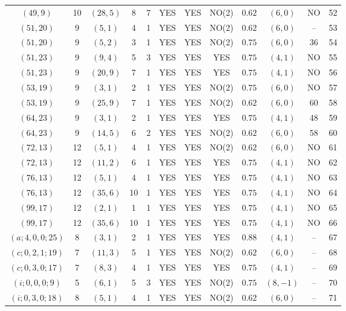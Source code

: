 \begin{longtable}{|c|c|c|c|c|c|c|c|c|c|c|c|}
$(49,9)$ & 10 & $(28,5)$ & 8 & 7 & YES & YES & NO(2) & $0.62$ & $(6,0)$ & NO & 52\\
$(51,20)$ & 9 & $(5,1)$ & 4 & 1 & YES & YES & NO(2) & $0.62$ & $(6,0)$ & -- & 53\\
$(51,20)$ & 9 & $(5,2)$ & 3 & 1 & YES & YES & NO(2) & $0.75$ & $(6,0)$ & 36 & 54\\
$(51,23)$ & 9 & $(9,4)$ & 5 & 3 & YES & YES & YES & $0.75$ & $(4,1)$ & NO & 55\\
$(51,23)$ & 9 & $(20,9)$ & 7 & 1 & YES & YES & YES & $0.75$ & $(4,1)$ & NO & 56\\
$(53,19)$ & 9 & $(3,1)$ & 2 & 1 & YES & YES & NO(2) & $0.75$ & $(6,0)$ & NO & 57\\
$(53,19)$ & 9 & $(25,9)$ & 7 & 1 & YES & YES & NO(2) & $0.62$ & $(6,0)$ & 60 & 58\\
$(64,23)$ & 9 & $(3,1)$ & 2 & 1 & YES & YES & YES & $0.75$ & $(4,1)$ & 48 & 59\\
$(64,23)$ & 9 & $(14,5)$ & 6 & 2 & YES & YES & NO(2) & $0.62$ & $(6,0)$ & 58 & 60\\
$(72,13)$ & 12 & $(5,1)$ & 4 & 1 & YES & YES & NO(2) & $0.62$ & $(6,0)$ & NO & 61\\
$(72,13)$ & 12 & $(11,2)$ & 6 & 1 & YES & YES & YES & $0.75$ & $(4,1)$ & NO & 62\\
$(76,13)$ & 12 & $(5,1)$ & 4 & 1 & YES & YES & YES & $0.75$ & $(4,1)$ & NO & 63\\
$(76,13)$ & 12 & $(35,6)$ & 10 & 1 & YES & YES & YES & $0.75$ & $(4,1)$ & NO & 64\\
$(99,17)$ & 12 & $(2,1)$ & 1 & 1 & YES & YES & YES & $0.75$ & $(4,1)$ & NO & 65\\
$(99,17)$ & 12 & $(35,6)$ & 10 & 1 & YES & YES & YES & $0.75$ & $(4,1)$ & NO & 66\\
$(a;4,0,0;25)$ & 8 & $(3,1)$ & 2 & 1 & YES & YES & YES & $0.88$ & $(4,1)$ & -- & 67\\
$(c;0,2,1;19)$ & 7 & $(11,3)$ & 5 & 1 & YES & YES & NO(2) & $0.62$ & $(6,0)$ & -- & 68\\
$(c;0,3,0;17)$ & 7 & $(8,3)$ & 4 & 1 & YES & YES & YES & $0.75$ & $(4,1)$ & -- & 69\\
$(i;0,0,0;9)$ & 5 & $(6,1)$ & 5 & 3 & YES & YES & NO(2) & $0.75$ & $(8,-1)$ & -- & 70\\
$(i;0,3,0;18)$ & 8 & $(5,1)$ & 4 & 1 & YES & YES & NO(2) & $0.62$ & $(6,0)$ & -- & 71
\end{longtable}
